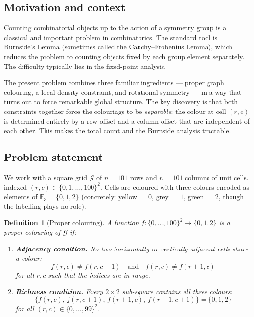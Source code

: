 \documentclass{article}
\newtheorem{definition}[theorem]{Definition}
\begin{document}
\subsection{Motivation and context}

Counting combinatorial objects up to the action of a symmetry
group is a classical and important problem in combinatorics.
The standard tool is Burnside's Lemma (sometimes called the
Cauchy--Frobenius Lemma), which reduces the problem to counting
objects fixed by each group element separately.
The difficulty typically lies in the fixed-point analysis.

The present problem combines three familiar ingredients ---
proper graph colouring, a local density constraint, and
rotational symmetry --- in a way that turns out to force
remarkable global structure.  The key discovery is that both
constraints together force the colourings to be
\emph{separable}: the colour at cell $(r,c)$ is determined
entirely by a row-offset and a column-offset that are
independent of each other.  This makes the total count and the
Burnside analysis tractable.

\subsection{Problem statement}

We work with a square grid $\mathcal{G}$ of $n = 101$ rows and
$n = 101$ columns of unit cells, indexed
$(r,c)\in\{0,1,\ldots,100\}^2$.  Cells are coloured with three
colours encoded as elements of $\mathbb{F}_3 = \{0,1,2\}$
(concretely: yellow $=0$, grey $=1$, green $=2$, though the
labelling plays no role).

\begin{definition}[Proper colouring]
A function $f:\{0,\ldots,100\}^2\to\{0,1,2\}$ is a
\emph{proper colouring} of $\mathcal{G}$ if:
\begin{enumerate}
  \item \textbf{Adjacency condition.}  No two horizontally or
    vertically adjacent cells share a colour:
    \[
      f(r,c)\neq f(r,c+1)\quad\text{and}\quad
      f(r,c)\neq f(r+1,c)
    \]
    for all $r,c$ such that the indices are in range.
  \item \textbf{Richness condition.}  Every $2\times 2$
    sub-square contains all three colours:
    \[
      \bigl\{f(r,c),\,f(r,c+1),\,f(r+1,c),\,f(r+1,c+1)\bigr\}
      = \{0,1,2\}
    \]
    for all $(r,c)\in\{0,\ldots,99\}^2$.
\end{enumerate}
\end{definition}
\end{document}
